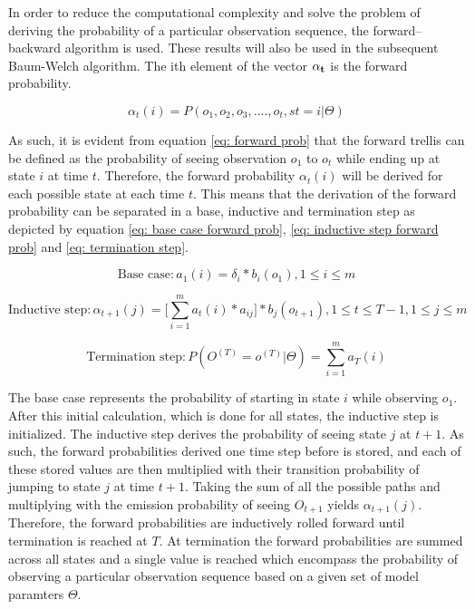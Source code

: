In order to reduce the computational complexity and solve the problem of deriving the probability of a particular observation sequence, the forward–backward algorithm is used. These results will also be used in the subsequent Baum-Welch algorithm. The ith element of the vector $\bold{\alpha_t}$ is the forward probability.

\begin{equation}
    \alpha_t(i) = P(o_1, o_2, o_3,....,o_t, st = i | \Theta)
    \label{eq: forward prob}
\end{equation}

As such, it is evident from equation \ref{eq: forward prob} that the forward trellis can be defined as the probability of seeing observation $o_1 $ to $o_t$ while ending up at state $i$ at time $t$. Therefore, the forward probability $\alpha_t(i)$ will be derived for each possible state at each time $t$. This means that the derivation of the forward probability can be separated in a base, inductive and termination step as depicted by equation \ref{eq: base case forward prob}, \ref{eq: inductive step forward prob} and \ref{eq: termination step}.

\begin{equation}
    \text{Base case}:  a_1(i) = \delta_i*b_i(o_1),  1 \leq i \leq m
    \label{eq: base case forward prob}
\end{equation}

\begin{equation}
    \text{Inductive step}: \alpha_{t+1}(j) = \Big[\sum_{i=1}^m a_t(i)*a_{ij}\Big] * b_j(o_{t+1}), 1\leq t \leq T - 1,
    1 \leq j \leq m
    \label{eq: inductive step forward prob}
\end{equation}

\begin{equation}
    \text{Termination step}: P(O^{(T)} = o^{(T)}|\Theta) = \sum_{i=1}^m a_T(i)
    \label{eq: termination step}
\end{equation}

The base case represents the probability of starting in state $i$ while observing $o_1$. After this initial calculation, which is done for all states, the inductive step is initialized. The inductive step derives the probability of seeing state $j$ at $t+1$. As such, the forward probabilities derived one time step before is stored, and each of these stored values are then multiplied with their transition probability of jumping to state $j$ at time $t+1$. Taking the sum of all the possible paths and multiplying with the emission probability of seeing $O_{t+1}$ yields $\alpha_{t+1}(j)$. Therefore, the forward probabilities are inductively rolled forward until termination is reached at $T$. At termination the forward probabilities are summed across all states and a single value is reached which encompass the probability of observing a particular observation sequence based on a given set of model paramters $\Theta$.

